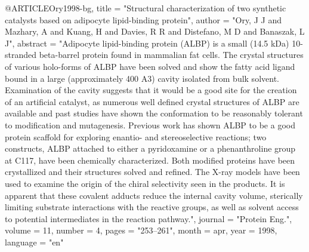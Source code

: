 @ARTICLE{Ory1998-bg,
  title    = "Structural characterization of two synthetic catalysts based on
              adipocyte lipid-binding protein",
  author   = "Ory, J J and Mazhary, A and Kuang, H and Davies, R R and
              Distefano, M D and Banaszak, L J",
  abstract = "Adipocyte lipid-binding protein (ALBP) is a small (14.5 kDa)
              10-stranded beta-barrel protein found in mammalian fat cells. The
              crystal structures of various holo-forms of ALBP have been solved
              and show the fatty acid ligand bound in a large (approximately
              400 A3) cavity isolated from bulk solvent. Examination of the
              cavity suggests that it would be a good site for the creation of
              an artificial catalyst, as numerous well defined crystal
              structures of ALBP are available and past studies have shown the
              conformation to be reasonably tolerant to modification and
              mutagenesis. Previous work has shown ALBP to be a good protein
              scaffold for exploring enantio- and stereoselective reactions;
              two constructs, ALBP attached to either a pyridoxamine or a
              phenanthroline group at C117, have been chemically characterized.
              Both modified proteins have been crystallized and their
              structures solved and refined. The X-ray models have been used to
              examine the origin of the chiral selectivity seen in the
              products. It is apparent that these covalent adducts reduce the
              internal cavity volume, sterically limiting substrate
              interactions with the reactive groups, as well as solvent access
              to potential intermediates in the reaction pathway.",
  journal  = "Protein Eng.",
  volume   =  11,
  number   =  4,
  pages    = "253--261",
  month    =  apr,
  year     =  1998,
  language = "en"
}

